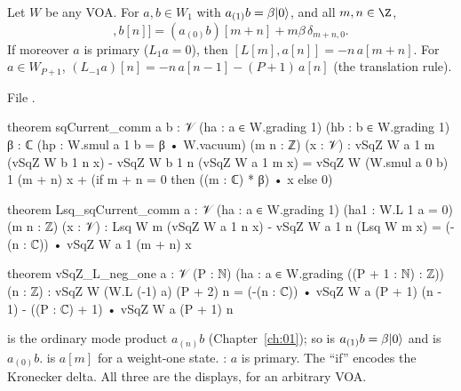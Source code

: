 \begin{theorem}\label{l25:thm:sqcomm}
Let $W$ be any VOA. For $a,b\in W_1$ with $a_{(1)}b=\beta|0\rangle$, and all $m,n\in\Z$,
\begin{equation*}
[a[m],b[n]]=(a_{(0)}b)[m+n]+m\beta\,\delta_{m+n,0}.
\end{equation*}
If moreover $a$ is primary ($L_1a=0$), then $[L[m],a[n]]=-n\,a[m+n]$. For $a\in W_{P+1}$,
$(L_{-1}a)[n]=-n\,a[n-1]-(P+1)\,a[n]$ (the translation rule).
\end{theorem}
\noindent File .
\begin{leancode}
theorem sqCurrent_comm {a b : 𝒱} (ha : a ∈ W.grading 1) (hb : b ∈ W.grading 1)
    {β : ℂ} (hp : W.smul a 1 b = β • W.vacuum) (m n : ℤ) (x : 𝒱) :
    vSqZ W a 1 m (vSqZ W b 1 n x) - vSqZ W b 1 n (vSqZ W a 1 m x)
      = vSqZ W (W.smul a 0 b) 1 (m + n) x + (if m + n = 0 then ((m : ℂ) * β) • x else 0)

theorem Lsq_sqCurrent_comm {a : 𝒱} (ha : a ∈ W.grading 1) (ha1 : W.L 1 a = 0) (m n : ℤ)
    (x : 𝒱) :
    Lsq W m (vSqZ W a 1 n x) - vSqZ W a 1 n (Lsq W m x) = (-(n : ℂ)) • vSqZ W a 1 (m + n) x

theorem vSqZ_L_neg_one {a : 𝒱} (P : ℕ) (ha : a ∈ W.grading ((P + 1 : ℕ) : ℤ)) (n : ℤ) :
    vSqZ W (W.L (-1) a) (P + 2) n
      = (-(n : ℂ)) • vSqZ W a (P + 1) (n - 1) - ((P : ℂ) + 1) • vSqZ W a (P + 1) n
\end{leancode}
\begin{dictionary}
 is the ordinary mode product $a_{(n)}b$ (Chapter~\ref{ch:01}); so  is
$a_{(1)}b=\beta|0\rangle$ and  is $a_{(0)}b$.  is $a[m]$ for a weight-one
state. : $a$ is primary. The ``if'' encodes the Kronecker delta. All three are the displays,
for an arbitrary VOA.
\end{dictionary}
